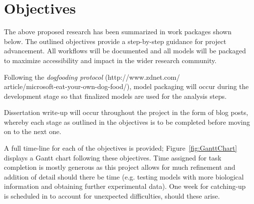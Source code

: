\documentclass{bioinfo}
\begin{document}
\section{Objectives}
The above proposed research has been summarized in work packages shown below. The outlined objectives provide a step-by-step guidance for project advancement. All workflows will be documented and all models will be packaged to maximize accessibility and impact in the wider research community. 

Following the \textit{dogfooding protocol} (http://www.zdnet.com/ \\article/microsoft-eat-your-own-dog-food/), model packaging will occur during the development stage so that finalized models are used for the analysis steps. 

Dissertation write-up will occur throughout the project in the form of blog posts, whereby each stage as outlined in the objectives is to be completed before moving on to the next one. 

A full time-line for each of the objectives is provided; Figure~\ref{fig:GanttChart} displays a Gantt chart following these objectives. Time assigned for task completion is mostly generous as this project allows for much refinement and addition of detail should there be time (e.g. testing models with more biological information and obtaining further experimental data). One week for catching-up is scheduled in to account for unexpected difficulties, should these arise.
\end{document}
